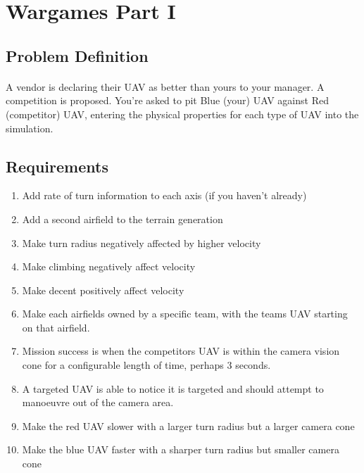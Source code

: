 \documentclass[11pt]{book}
\begin{document}
\clearpage


\section{Wargames Part I}

\subsection{Problem Definition}

\paragraph{} A vendor is declaring their UAV as better than yours to your manager. A competition is proposed. You're asked to pit Blue (your) UAV against Red (competitor) UAV, entering the physical properties for each type of UAV into the simulation.

\subsection{Requirements}

\begin{enumerate}
\item Add rate of turn information to each axis (if you haven't already)
\item Add a second airfield to the terrain generation
\item Make turn radius negatively affected by higher velocity
\item Make climbing negatively affect velocity
\item Make decent positively affect velocity
\item Make each airfields owned by a specific team, with the teams UAV starting on that airfield.
\item Mission success is when the competitors UAV is within the camera vision cone for a configurable length of time, perhaps 3 seconds.
\item A targeted UAV is able to notice it is targeted and should attempt to manoeuvre out of the camera area.
\item Make the red UAV slower with a larger turn radius but a larger camera cone
\item Make the blue UAV faster with a sharper turn radius but smaller camera cone
\end{enumerate}
\end{document}
